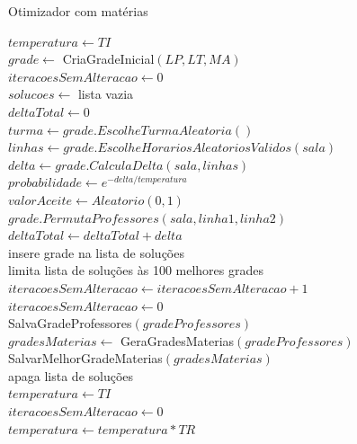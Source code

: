 \begin{algorithm}
	\caption{Otimizador com matérias}
	\label{alg:otimizadorCompleto}
	$temperatura \leftarrow TI$\\
	$grade \leftarrow$ CriaGradeInicial$(LP, LT, MA)$\\
	$iteracoesSemAlteracao \leftarrow 0$\\
	$solucoes \leftarrow$ lista vazia\\
	 {
		$deltaTotal \leftarrow 0$\\
		 {
			$turma \leftarrow grade.EscolheTurmaAleatoria()$\\
			$linhas \leftarrow grade.EscolheHorariosAleatoriosValidos(sala)$\\
			$delta \leftarrow grade.CalculaDelta(sala, linhas)$\\
			$probabilidade \leftarrow e^{-delta/temperatura}$\\
			$valorAceite \leftarrow Aleatorio(0, 1)$\\
			 {
				$grade.PermutaProfessores(sala, linha1, linha2)$\\
				$deltaTotal \leftarrow deltaTotal + delta$\\
				 {
					insere grade na lista de soluções\\
					limita lista de soluções às 100 melhores grades\\
				}
			}
		}
		 {
			$iteracoesSemAlteracao \leftarrow iteracoesSemAlteracao + 1$\\
		}{
			$iteracoesSemAlteracao \leftarrow 0$\\
		}
		 {
			 {
				SalvaGradeProfessores$(gradeProfessores)$\\
				$gradesMaterias \leftarrow$ GeraGradesMaterias$(gradeProfessores)$\\
				SalvarMelhorGradeMaterias$(gradesMaterias)$\\
			}
			apaga lista de soluções\\
			$temperatura \leftarrow TI$\\
			$iteracoesSemAlteracao \leftarrow 0$\\
		}
		$temperatura \leftarrow temperatura * TR$
	}
\end{algorithm}
